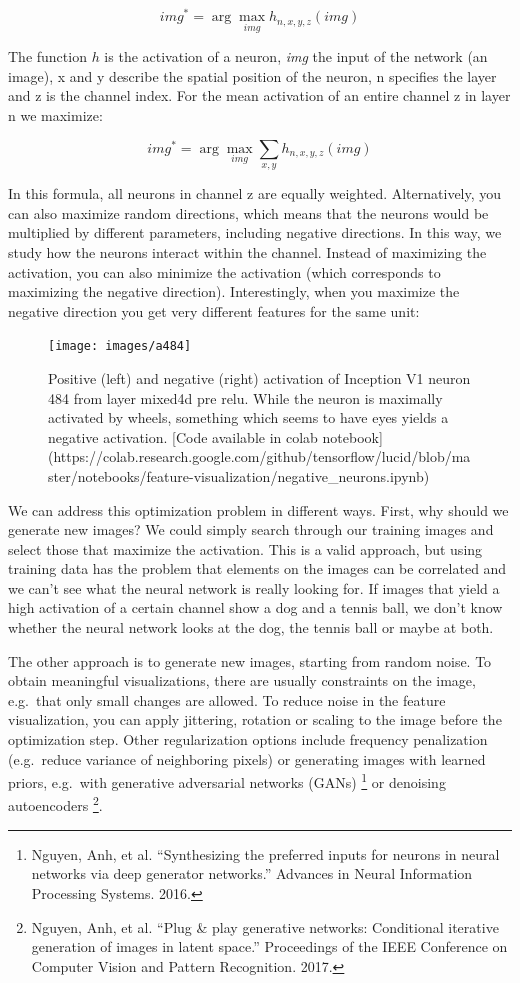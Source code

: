 \documentclass[12pt,]{krantz}
\begin{document}
\[img^*=\arg\max_{img}h_{n,x,y,z}(img)\]

The function \(h\) is the activation of a neuron, \emph{img} the input
of the network (an image), x and y describe the spatial position of the
neuron, n specifies the layer and z is the channel index. For the mean
activation of an entire channel z in layer n we maximize:

\[img^*=\arg\max_{img}\sum_{x,y}h_{n,x,y,z}(img)\]

In this formula, all neurons in channel z are equally weighted.
Alternatively, you can also maximize random directions, which means that
the neurons would be multiplied by different parameters, including
negative directions. In this way, we study how the neurons interact
within the channel. Instead of maximizing the activation, you can also
minimize the activation (which corresponds to maximizing the negative
direction). Interestingly, when you maximize the negative direction you
get very different features for the same unit:

\begin{figure}

{\centering \texttt{[image: images/a484]} 

}

\caption{Positive (left) and negative (right) activation of Inception V1 neuron 484 from layer mixed4d pre relu. While the neuron is maximally activated by wheels, something which seems to have eyes yields a negative activation. [Code available in colab notebook](https://colab.research.google.com/github/tensorflow/lucid/blob/master/notebooks/feature-visualization/negative\_neurons.ipynb)}\label{fig:pos-neg}
\end{figure}

We can address this optimization problem in different ways. First, why
should we generate new images? We could simply search through our
training images and select those that maximize the activation. This is a
valid approach, but using training data has the problem that elements on
the images can be correlated and we can't see what the neural network is
really looking for. If images that yield a high activation of a certain
channel show a dog and a tennis ball, we don't know whether the neural
network looks at the dog, the tennis ball or maybe at both.

The other approach is to generate new images, starting from random
noise. To obtain meaningful visualizations, there are usually
constraints on the image, e.g.~that only small changes are allowed. To
reduce noise in the feature visualization, you can apply jittering,
rotation or scaling to the image before the optimization step. Other
regularization options include frequency penalization (e.g.~reduce
variance of neighboring pixels) or generating images with learned
priors, e.g.~with generative adversarial networks (GANs) \footnote{Nguyen,
  Anh, et al. ``Synthesizing the preferred inputs for neurons in neural
  networks via deep generator networks.'' Advances in Neural Information
  Processing Systems. 2016.} or denoising autoencoders \footnote{Nguyen,
  Anh, et al. ``Plug \& play generative networks: Conditional iterative
  generation of images in latent space.'' Proceedings of the IEEE
  Conference on Computer Vision and Pattern Recognition. 2017.}.
\end{document}
